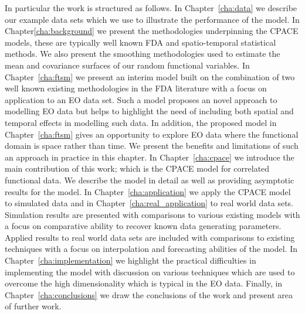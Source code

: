 In particular the work is structured as follows.
In Chapter~\ref{cha:data} we describe our example data sets which we use to illustrate the performance of the model.
In Chapter\ref{cha:background} we present the methodologies underpinning the CPACE models, these are typically well known FDA and spatio-temporal statistical methods.
We also present the smoothing methodologies used to estimate the mean and covariance surfaces of our random functional variables.
In Chapter~\ref{cha:ftsm} we present an interim model built on the combination of two well known existing methodologies in the FDA literature with a focus on application to an EO data set.
Such a model proposes an novel approach to modelling EO data but helps to highlight the need of including both spatial and temporal effects in modelling such data.
In addition, the proposed model in Chapter~\ref{cha:ftsm} gives an opportunity to explore EO data where the functional domain is space rather than time.
We present the benefits and limitations of such an approach in practice in this chapter.
In Chapter~\ref{cha:cpace} we introduce the main contribution of this work; which is the CPACE model for correlated functional data.
We describe the model in detail as well as providing asymptotic results for the model.
In Chapter~\ref{cha:application} we apply the CPACE model to simulated data and in Chapter~\ref{cha:real_application} to real world data sets.
Simulation results are presented with comparisons to various existing models with a focus on comparative ability to recover known data generating parameters.
Applied results to real world data sets are included with comparisons to existing techniques with a focus on interpolation and forecasting abilities of the model.
In Chapter~\ref{cha:implementation} we highlight the practical difficulties in implementing the model with discussion on various techniques which are used to overcome the high dimensionality which is typical in the EO data.
Finally, in Chapter~\ref{cha:conclusions} we draw the conclusions of the work and present area of further work. 